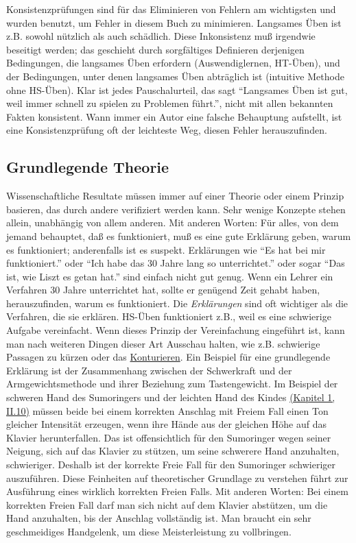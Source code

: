Konsistenzprüfungen sind für das Eliminieren von Fehlern am wichtigsten und wurden benutzt, um Fehler in diesem Buch zu minimieren.
 Langsames Üben ist z.B. sowohl nützlich als auch schädlich.
 Diese Inkonsistenz muß irgendwie beseitigt werden; das geschieht durch sorgfältiges Definieren derjenigen Bedingungen, die langsames Üben erfordern (Auswendiglernen, HT-Üben), und der Bedingungen, unter denen langsames Üben abträglich ist (intuitive Methode ohne HS-Üben).
 Klar ist jedes Pauschalurteil, das sagt \enquote{Langsames Üben ist gut, weil immer schnell zu spielen zu Problemen führt.}, nicht mit allen bekannten Fakten konsistent.
 Wann immer ein Autor eine falsche Behauptung aufstellt, ist eine Konsistenzprüfung oft der leichteste Weg, diesen Fehler herauszufinden.
 \hypertarget{c3_3f}{}

\subsection{Grundlegende Theorie}

Wissenschaftliche Resultate müssen immer auf einer Theorie oder einem Prinzip basieren, das durch andere verifiziert werden kann.
 Sehr wenige Konzepte stehen allein, unabhängig von allem anderen.
 Mit anderen Worten: Für alles, von dem jemand behauptet, daß es funktioniert, muß es eine gute Erklärung geben, warum es funktioniert; anderenfalls ist es suspekt.
 Erklärungen wie \enquote{Es hat bei mir funktioniert.} oder \enquote{Ich habe das 30 Jahre lang so unterrichtet.} oder sogar \enquote{Das ist, wie Liszt es getan hat.} sind einfach nicht gut genug.
 Wenn ein Lehrer ein Verfahren 30 Jahre unterrichtet hat, sollte er genügend Zeit gehabt haben, herauszufinden, warum es funktioniert.
 Die \textit{Erklärungen} sind oft wichtiger als die Verfahren, die sie erklären.
 HS-Üben funktioniert z.B., weil es eine schwierige Aufgabe vereinfacht.
 Wenn dieses Prinzip der Vereinfachung eingeführt ist, kann man nach weiteren Dingen dieser Art Ausschau halten, wie z.B. schwierige Passagen zu kürzen oder das \hyperlink{c1iii8}{Konturieren}.
 Ein Beispiel für eine grundlegende Erklärung ist der Zusammenhang zwischen der Schwerkraft und der Armgewichtsmethode und ihrer Beziehung zum Tastengewicht.
 Im Beispiel der schweren Hand des Sumoringers und der leichten Hand des Kindes \hyperlink{c1ii10}{(Kapitel 1, II.10)} müssen beide bei einem korrekten Anschlag mit Freiem Fall einen Ton gleicher Intensität erzeugen, wenn ihre Hände aus der gleichen Höhe auf das Klavier herunterfallen.
 Das ist offensichtlich  für den Sumoringer wegen seiner Neigung, sich auf das Klavier zu stützen, um seine schwerere Hand anzuhalten, schwieriger.
 Deshalb ist der korrekte Freie Fall für den Sumoringer schwieriger auszuführen.
 Diese Feinheiten auf theoretischer Grundlage zu verstehen führt zur Ausführung eines wirklich korrekten Freien Falls.
 Mit anderen Worten: Bei einem korrekten Freien Fall darf man sich nicht auf dem Klavier abstützen, um die Hand anzuhalten, bis der Anschlag vollständig ist.
 Man braucht ein sehr geschmeidiges Handgelenk, um diese Meisterleistung zu vollbringen.
 

